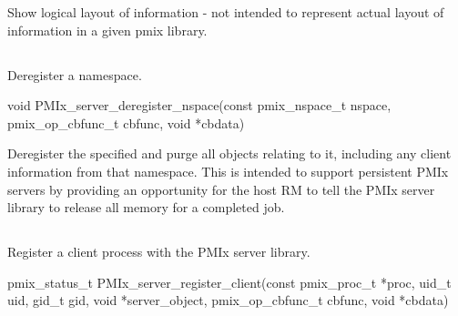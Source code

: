 Show logical layout of information - not intended to represent actual layout of information in a given pmix library.
\subsection{}

\summary

Deregister a namespace.

\format

\cspecificstart
\begin{codepar}
void PMIx_server_deregister_nspace(const pmix_nspace_t nspace,
                        pmix_op_cbfunc_t cbfunc, void *cbdata)
\end{codepar}
\cspecificend

\begin{arglist}
\end{arglist}

\descr

Deregister the specified  and purge all objects relating to it, including any client information from that namespace.
This is intended to support persistent \ac{PMIx} servers by providing an opportunity for the host \ac{RM} to tell the \ac{PMIx} server library to release all memory for a completed job.



\subsection{}

\summary

Register a client process with the PMIx server library.

\format

\cspecificstart
\begin{codepar}
pmix_status_t
PMIx_server_register_client(const pmix_proc_t *proc,
                        uid_t uid, gid_t gid,
                        void *server_object,
                        pmix_op_cbfunc_t cbfunc, void *cbdata)
\end{codepar}
\cspecificend

